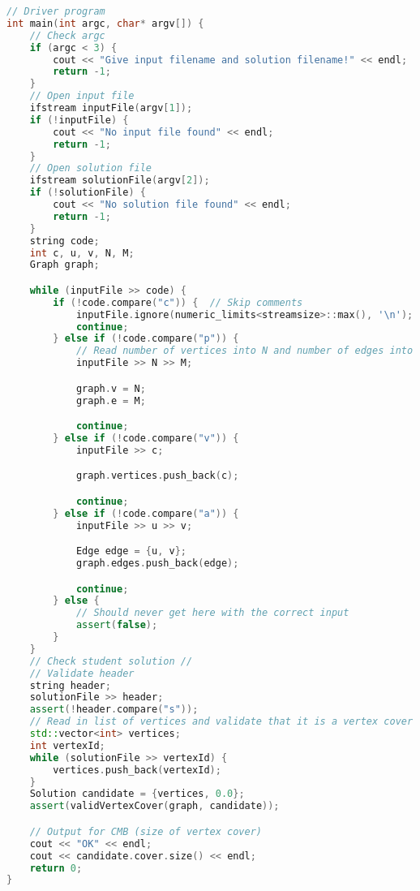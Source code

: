 \begin{lstlisting}[language=c++]
// Driver program
int main(int argc, char* argv[]) {
    // Check argc
    if (argc < 3) {
        cout << "Give input filename and solution filename!" << endl;
        return -1;
    }
    // Open input file
    ifstream inputFile(argv[1]);
    if (!inputFile) {
        cout << "No input file found" << endl;
        return -1;
    }
    // Open solution file
    ifstream solutionFile(argv[2]);
    if (!solutionFile) {
        cout << "No solution file found" << endl;
        return -1;
    }
    string code;
    int c, u, v, N, M;
    Graph graph;

    while (inputFile >> code) {
        if (!code.compare("c")) {  // Skip comments
            inputFile.ignore(numeric_limits<streamsize>::max(), '\n');
            continue;
        } else if (!code.compare("p")) {
            // Read number of vertices into N and number of edges into M
            inputFile >> N >> M;

            graph.v = N;
            graph.e = M;

            continue;
        } else if (!code.compare("v")) {
            inputFile >> c;

            graph.vertices.push_back(c);

            continue;
        } else if (!code.compare("a")) {
            inputFile >> u >> v;

            Edge edge = {u, v};
            graph.edges.push_back(edge);

            continue;
        } else {
            // Should never get here with the correct input
            assert(false);
        }
    }
    // Check student solution //
    // Validate header
    string header;
    solutionFile >> header;
    assert(!header.compare("s"));
    // Read in list of vertices and validate that it is a vertex cover
    std::vector<int> vertices;
    int vertexId;
    while (solutionFile >> vertexId) {
        vertices.push_back(vertexId);
    }
    Solution candidate = {vertices, 0.0};
    assert(validVertexCover(graph, candidate));

    // Output for CMB (size of vertex cover)
    cout << "OK" << endl;
    cout << candidate.cover.size() << endl;
    return 0;
}
\end{lstlisting}
